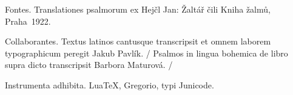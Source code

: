 \documentclass[a4paper, twoside, 12pt]{article}
\begin{document}
\pagebreak

\cantusCumNeumis


\antiphonaIII




\vfill

\pagebreak

\cantusCumNeumis


\antiphonaIV




\vfill

\pagebreak

\cantusCumNeumis


\antiphonaV




\vfill

\pagebreak

\pagestyle{empty}

Fontes. 
Translationes psalmorum ex
Hejčl Jan: Žaltář čili Kniha žalmů, Praha~1922.

Collaborantes.
Textus latinos cantusque transcripsit et omnem laborem typographicum peregit
Jakub Pavlík. /
Psalmos in lingua bohemica de libro supra dicto transcripsit
Barbora Maturová. /

Instrumenta adhibita.
LuaTeX, %
Gregorio, %
typi Junicode. %
\end{document}
